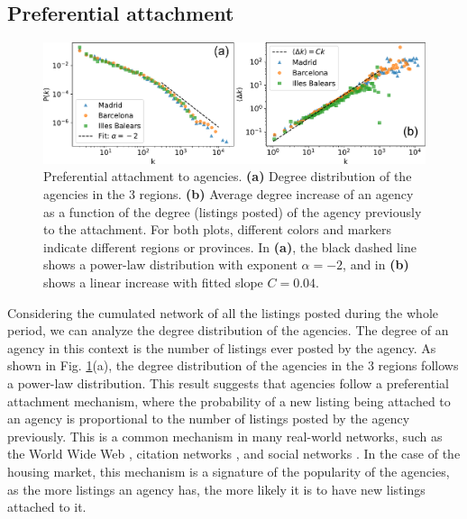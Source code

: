 \subsection{Preferential attachment}

\begin{figure}
    \centering
    \includegraphics[width =\textwidth]{Figs/Idealista_dynamics/panel_degree.pdf}
	\caption[Preferential attachment to agencies.]{\label{fig:panel_degree}Preferential attachment to agencies. \textbf{(a)} Degree distribution of the agencies in the 3 regions. \textbf{(b)} Average degree increase of an agency as a function of the degree (listings posted) of the agency previously to the attachment. For both plots, different colors and markers indicate different regions or provinces. In \textbf{(a)}, the black dashed line shows a power-law distribution with exponent $\alpha  =-2$, and in \textbf{(b)} shows a linear increase with fitted slope $C = 0.04$.}
\end{figure}

Considering the cumulated network of all the listings posted during the whole period, we can analyze the degree distribution of the agencies. The degree of an agency in this context is the number of listings ever posted by the agency. As shown in Fig. \ref{fig:panel_degree}(a), the degree distribution of the agencies in the 3 regions follows a power-law distribution. This result suggests that agencies follow a preferential attachment mechanism, where the probability of a new listing being attached to an agency is proportional to the number of listings posted by the agency previously. This is a common mechanism in many real-world networks, such as the World Wide Web \cite{barabasi1999emergence}, citation networks \cite{redner1998popular}, and social networks \cite{barabasi1999emergence}. In the case of the housing market, this mechanism is a signature of the popularity of the agencies, as the more listings an agency has, the more likely it is to have new listings attached to it.

